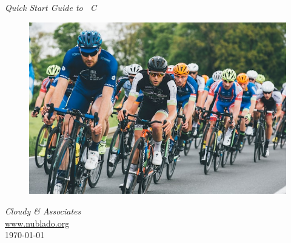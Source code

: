 \documentclass[12pt,twoside]{article}
\begin{document}

\begin{titlepage}
\begin{center}

\Huge
\emph{Quick Start Guide to \Cloudy\ C\VERSION}\\
\begin{figure}
\begin{center}
\includegraphics[clip=on,width=\columnwidth,height=0.7\textheight,keepaspectratio]{cycling_race.jpg}
\end{center}
\label{fig:header}
\end{figure}

\LARGE

\vspace{15 mm }
\LARGE
\emph{Cloudy \& Associates} \\
\Large
\href{http://www.nublado.org}{www.nublado.org} \\
\normalsize
\today
\end{center}
\end{titlepage}
\end{document}
